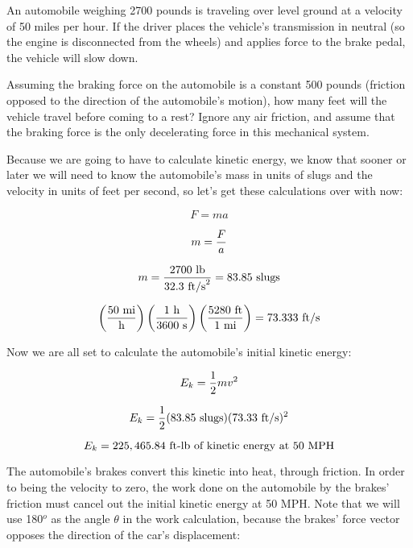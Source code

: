 

An automobile weighing 2700 pounds is traveling over level ground at a velocity of 50 miles per hour.  If the driver places the vehicle's transmission in neutral (so the engine is disconnected from the wheels) and applies force to the brake pedal, the vehicle will slow down.

\vskip 10pt

Assuming the braking force on the automobile is a constant 500 pounds (friction opposed to the direction of the automobile's motion), how many feet will the vehicle travel before coming to a rest?  Ignore any air friction, and assume that the braking force is the only decelerating force in this mechanical system.







Because we are going to have to calculate kinetic energy, we know that sooner or later we will need to know the automobile's mass in units of slugs and the velocity in units of feet per second, so let's get these calculations over with now:

$$F = m a$$

$$m = {F \over a}$$

$$m = {2700 \hbox{ lb} \over 32.3 \hbox{ ft/s}^2} = 83.85 \hbox{ slugs}$$

\vskip 10pt

$$\left(50 \hbox{ mi} \over \hbox{h} \right) \left(1 \hbox{ h} \over 3600 \hbox{ s} \right) \left(5280 \hbox{ ft} \over 1 \hbox{ mi} \right) = 73.333 \hbox{ ft/s}$$

\vskip 10pt

Now we are all set to calculate the automobile's initial kinetic energy:

$$E_k = {1 \over 2} m v^2$$

$$E_k = {1 \over 2} (83.85 \hbox{ slugs}) (73.33 \hbox{ ft/s})^2$$

$$E_k = 225,465.84 \hbox{ ft-lb of kinetic energy at 50 MPH}$$

The automobile's brakes convert this kinetic into heat, through friction.  In order to being the velocity to zero, the work done on the automobile by the brakes' friction must cancel out the initial kinetic energy at 50 MPH.  Note that we will use 180$^{o}$ as the angle $\theta$ in the work calculation, because the brakes' force vector opposes the direction of the car's displacement:

